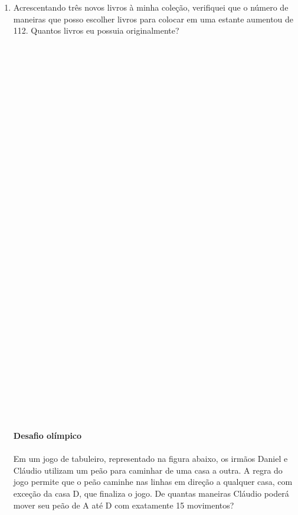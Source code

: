 \documentclass[a4paper,14pt]{article}
\begin{document}
\begin{multicols}{2}
\begin{enumerate}
   			\item Acrescentando três novos livros à minha coleção, verifiquei que o número de maneiras que posso escolher livros para colocar em uma estante aumentou de 112. Quantos livros eu possuia originalmente? \\\\\\\\\\\\\\\\\\\\\\\\\\\\\\\\\\\\\\\\\\\\\\\\\\\\\\\\\\\\\\\\\\\\\\
   			\textbf{Desafio olímpico} \\\\
   			Em um jogo de tabuleiro, representado na figura abaixo, os irmãos Daniel e Cláudio utilizam um peão para caminhar de uma casa a outra. A regra do jogo permite que o peão caminhe nas linhas em direção a qualquer casa, com exceção da casa D, que finaliza o jogo. De quantas maneiras Cláudio poderá mover seu peão de A até D com exatamente 15 movimentos? 

\end{enumerate}
\end{multicols}
\end{document}
